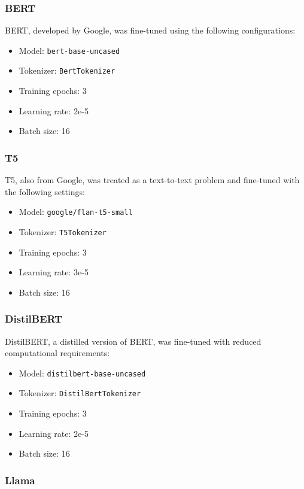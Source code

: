 \documentclass[conference]{IEEEtran}
\begin{document}
\subsubsection{BERT}

BERT, developed by Google, was fine-tuned using the following configurations:
\begin{itemize}
    \item Model: \texttt{bert-base-uncased}
    \item Tokenizer: \texttt{BertTokenizer}
    \item Training epochs: 3
    \item Learning rate: 2e-5
    \item Batch size: 16
\end{itemize}

\subsubsection{T5}

T5, also from Google, was treated as a text-to-text problem and fine-tuned with the following settings:
\begin{itemize}
    \item Model: \texttt{google/flan-t5-small}
    \item Tokenizer: \texttt{T5Tokenizer}
    \item Training epochs: 3
    \item Learning rate: 3e-5
    \item Batch size: 16
\end{itemize}

\subsubsection{DistilBERT}

DistilBERT, a distilled version of BERT, was fine-tuned with reduced computational requirements:
\begin{itemize}
    \item Model: \texttt{distilbert-base-uncased}
    \item Tokenizer: \texttt{DistilBertTokenizer}
    \item Training epochs: 3
    \item Learning rate: 2e-5
    \item Batch size: 16
\end{itemize}

\subsubsection{Llama}
\end{document}
